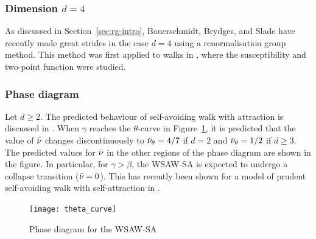 \subsubsection{Dimension $d = 4$}

As discussed in Section~\ref{sec:rg-intro}, Bauerschmidt, Brydges, and Slade have
recently made great strides in the case $d = 4$  using
a  renormalisation group method.
This method was first applied to walks
in \cite{BBS-saw4-log,BBS-saw4}, where the susceptibility and two-point function were
studied.

\subsubsection{Phase diagram}

Let $d \ge 2$. The predicted behaviour of self-avoiding walk with attraction is discussed
in \cite{Vand98}.
When $\gamma$ reaches the $\theta$-curve in Figure~\ref{fig:theta-curve}, it is predicted
that the value of $\bar\nu$ changes discontinuously to $\bar\nu_\theta = 4/7$ if $d = 2$
and $\bar\nu_\theta = 1/2$ if $d \ge 3$. The predicted values for $\bar\nu$
in the other regions of the phase diagram are shown in the figure. In particular, for
$\gamma > \beta$, the WSAW-SA is expected to undergo a collapse transition ($\bar\nu = 0$).
This has recently been shown for a model of prudent self-avoiding walk with self-attraction
in \cite{PT16}.

\begin{figure}
\centering
\texttt{[image: theta\_curve]}
\caption[Phase diagram of WSAW-SA]{Phase diagram for the WSAW-SA}
\label{fig:theta-curve}
\end{figure}
